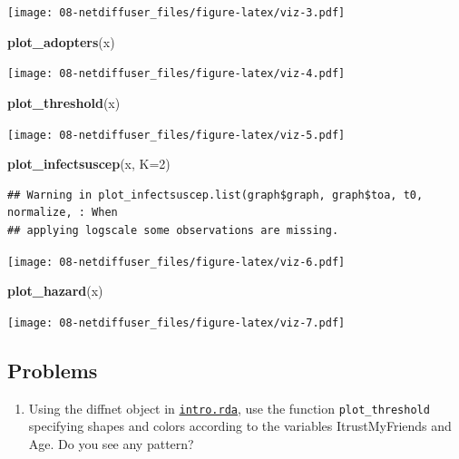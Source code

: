 \documentclass[]{book}
\newenvironment{Shaded}{\begin{snugshade}}{\end{snugshade}}
\newcommand{\DataTypeTok}[1]{\textcolor[rgb]{0.13,0.29,0.53}{#1}}
\newcommand{\DecValTok}[1]{\textcolor[rgb]{0.00,0.00,0.81}{#1}}
\newcommand{\KeywordTok}[1]{\textcolor[rgb]{0.13,0.29,0.53}{\textbf{#1}}}
\newcommand{\NormalTok}[1]{#1}
\providecommand{\tightlist}{%
  \setlength{\itemsep}{0pt}\setlength{\parskip}{0pt}}
\begin{document}
\texttt{[image: 08-netdiffuser\_files/figure-latex/viz-3.pdf]}

\begin{Shaded}
\begin{Highlighting}[]
\KeywordTok{plot_adopters}\NormalTok{(x)}
\end{Highlighting}
\end{Shaded}

\texttt{[image: 08-netdiffuser\_files/figure-latex/viz-4.pdf]}

\begin{Shaded}
\begin{Highlighting}[]
\KeywordTok{plot_threshold}\NormalTok{(x)}
\end{Highlighting}
\end{Shaded}

\texttt{[image: 08-netdiffuser\_files/figure-latex/viz-5.pdf]}

\begin{Shaded}
\begin{Highlighting}[]
\KeywordTok{plot_infectsuscep}\NormalTok{(x, }\DataTypeTok{K=}\DecValTok{2}\NormalTok{)}
\end{Highlighting}
\end{Shaded}

\begin{verbatim}
## Warning in plot_infectsuscep.list(graph$graph, graph$toa, t0, normalize, : When
## applying logscale some observations are missing.
\end{verbatim}

\texttt{[image: 08-netdiffuser\_files/figure-latex/viz-6.pdf]}

\begin{Shaded}
\begin{Highlighting}[]
\KeywordTok{plot_hazard}\NormalTok{(x)}
\end{Highlighting}
\end{Shaded}

\texttt{[image: 08-netdiffuser\_files/figure-latex/viz-7.pdf]}

\hypertarget{problems}{%
\subsection{Problems}\label{problems}}

\begin{enumerate}
\def\labelenumi{\arabic{enumi}.}
\tightlist
\item
  Using the diffnet object in \href{intro.rda}{\texttt{intro.rda}}, use the function \texttt{plot\_threshold} specifying
  shapes and colors according to the variables ItrustMyFriends and Age. Do you see any pattern?
\end{enumerate}
\end{document}
